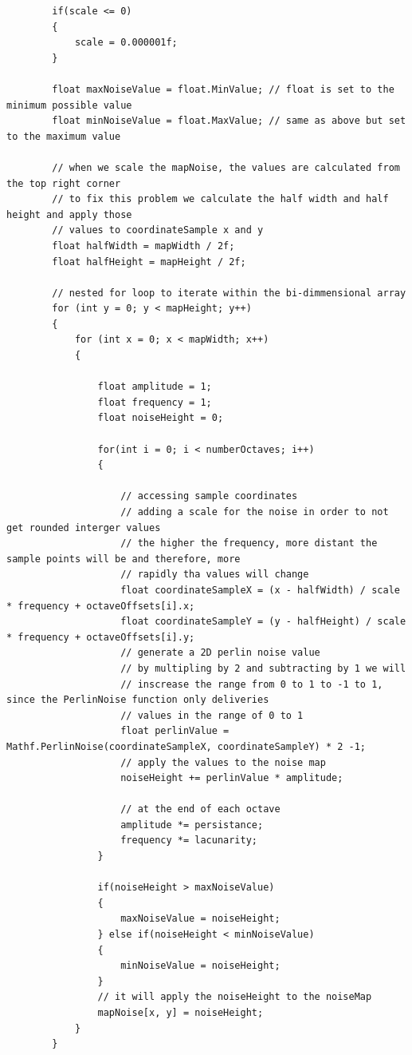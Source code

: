 \documentclass[a4paper,12pt]{book}
\begin{document}
\begin{lstlisting}
        if(scale <= 0)
        {
            scale = 0.000001f;
        }

        float maxNoiseValue = float.MinValue; // float is set to the minimum possible value
        float minNoiseValue = float.MaxValue; // same as above but set to the maximum value

        // when we scale the mapNoise, the values are calculated from the top right corner
        // to fix this problem we calculate the half width and half height and apply those 
        // values to coordinateSample x and y
        float halfWidth = mapWidth / 2f;
        float halfHeight = mapHeight / 2f;

        // nested for loop to iterate within the bi-dimmensional array
        for (int y = 0; y < mapHeight; y++)
        {
            for (int x = 0; x < mapWidth; x++)
            {

                float amplitude = 1;
                float frequency = 1;
                float noiseHeight = 0;

                for(int i = 0; i < numberOctaves; i++)
                {

                    // accessing sample coordinates
                    // adding a scale for the noise in order to not get rounded interger values
                    // the higher the frequency, more distant the sample points will be and therefore, more
                    // rapidly tha values will change
                    float coordinateSampleX = (x - halfWidth) / scale * frequency + octaveOffsets[i].x;
                    float coordinateSampleY = (y - halfHeight) / scale * frequency + octaveOffsets[i].y; 
                    // generate a 2D perlin noise value
                    // by multipling by 2 and subtracting by 1 we will
                    // inscrease the range from 0 to 1 to -1 to 1, since the PerlinNoise function only deliveries
                    // values in the range of 0 to 1
                    float perlinValue = Mathf.PerlinNoise(coordinateSampleX, coordinateSampleY) * 2 -1;
                    // apply the values to the noise map
                    noiseHeight += perlinValue * amplitude;

                    // at the end of each octave
                    amplitude *= persistance;
                    frequency *= lacunarity;
                }

                if(noiseHeight > maxNoiseValue)
                {
                    maxNoiseValue = noiseHeight;
                } else if(noiseHeight < minNoiseValue)
                {
                    minNoiseValue = noiseHeight;
                }
                // it will apply the noiseHeight to the noiseMap
                mapNoise[x, y] = noiseHeight;               
            }
        }


\end{lstlisting}
\end{document}
